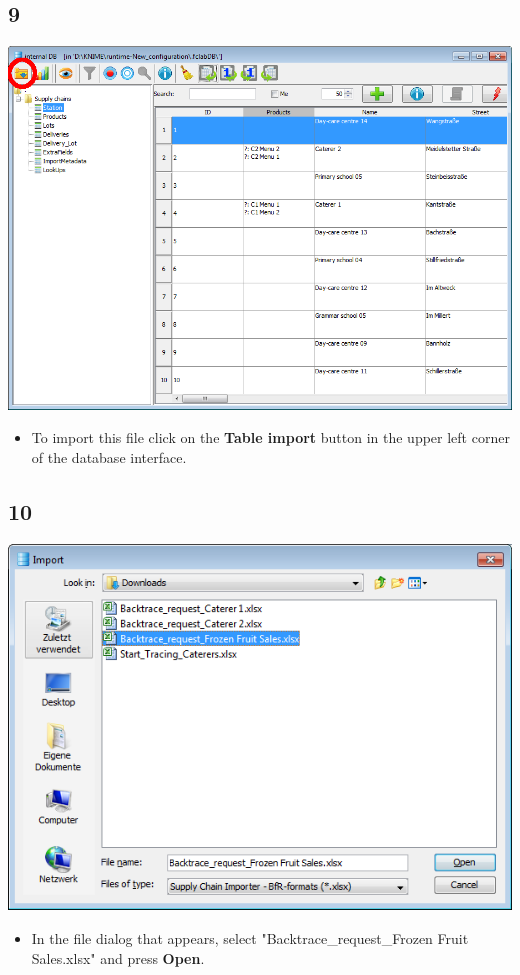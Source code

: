 \documentclass{beamer}
\begin{document}
\subsection{9}
\begin{frame}
	\begin{center}
  		\includegraphics[height=0.6\textheight]{9.png}
	\end{center}
	\begin{itemize}
		\item To import this file click on the \textbf{Table import} button in the upper left corner of the database interface.
	\end{itemize}
\end{frame}

\subsection{10}
\begin{frame}
	\begin{center}
  		\includegraphics[height=0.5\textheight]{10.png}
	\end{center}
	\begin{itemize}
		\item In the file dialog that appears, select "Backtrace\_request\_Frozen Fruit Sales.xlsx" and press \textbf{Open}.
	\end{itemize}
\end{frame}
\end{document}
